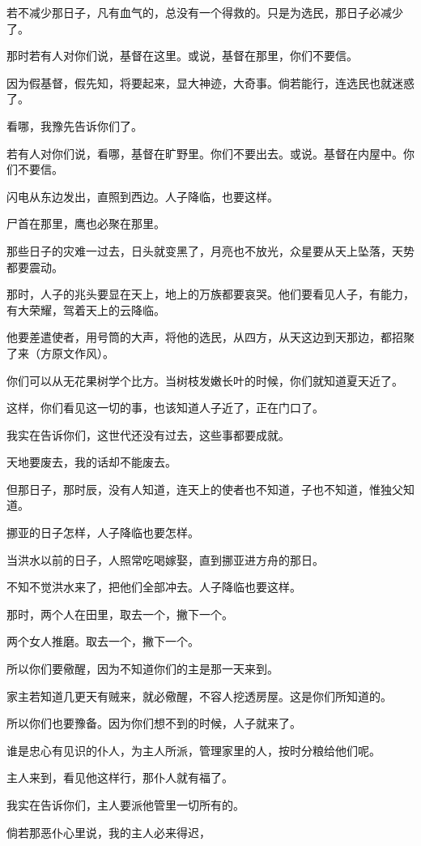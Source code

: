 \documentclass[12pt,oneside]{book}
\begin{document}
若不减少那日子，凡有血气的，总没有一个得救的。只是为选民，那日子必减少了。

那时若有人对你们说，基督在这里。或说，基督在那里，你们不要信。

因为假基督，假先知，将要起来，显大神迹，大奇事。倘若能行，连选民也就迷惑了。

看哪，我豫先告诉你们了。

若有人对你们说，看哪，基督在旷野里。你们不要出去。或说。基督在内屋中。你们不要信。

闪电从东边发出，直照到西边。人子降临，也要这样。

尸首在那里，鹰也必聚在那里。

那些日子的灾难一过去，日头就变黑了，月亮也不放光，众星要从天上坠落，天势都要震动。

那时，人子的兆头要显在天上，地上的万族都要哀哭。他们要看见人子，有能力，有大荣耀，驾着天上的云降临。

他要差遣使者，用号筒的大声，将他的选民，从四方，从天这边到天那边，都招聚了来（方原文作风）。

你们可以从无花果树学个比方。当树枝发嫩长叶的时候，你们就知道夏天近了。

这样，你们看见这一切的事，也该知道人子近了，正在门口了。

我实在告诉你们，这世代还没有过去，这些事都要成就。

天地要废去，我的话却不能废去。

但那日子，那时辰，没有人知道，连天上的使者也不知道，子也不知道，惟独父知道。

挪亚的日子怎样，人子降临也要怎样。

当洪水以前的日子，人照常吃喝嫁娶，直到挪亚进方舟的那日。

不知不觉洪水来了，把他们全部冲去。人子降临也要这样。

那时，两个人在田里，取去一个，撇下一个。

两个女人推磨。取去一个，撇下一个。

所以你们要儆醒，因为不知道你们的主是那一天来到。

家主若知道几更天有贼来，就必儆醒，不容人挖透房屋。这是你们所知道的。

所以你们也要豫备。因为你们想不到的时候，人子就来了。

谁是忠心有见识的仆人，为主人所派，管理家里的人，按时分粮给他们呢。

主人来到，看见他这样行，那仆人就有福了。

我实在告诉你们，主人要派他管里一切所有的。

倘若那恶仆心里说，我的主人必来得迟，
\end{document}
